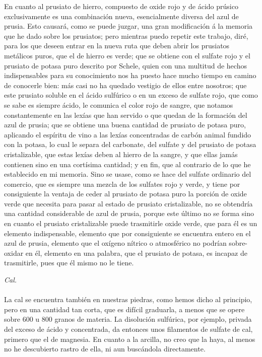 \documentclass[a4paper, 11pt, oneside, polutonikogreek, spanish]{article}
\begin{document}
En cuanto al prusiato de hierro, compuesto de oxide rojo y de ácido prúsico exclusivamente es una combinación nueva, esencialmente diversa del azul de prusia. Esto causará, como se puede juzgar, una gran modificación á la memoria que he dado sobre los prusiatos; pero mientras puedo repetir este trabajo, diré, para los que deseen entrar en la nueva ruta que deben abrir los prusiatos metálicos puros, que el de hierro es verde; que se obtiene con el sulfate rojo y el prusiato de potasa puro descrito por Schele, quien con una multitud de hechos indispensables para su conocimiento nos ha puesto hace mucho tiempo en camino de conocerle bien: más casi no ha quedado vestigio de ellos entre nosotros; que este prusiato soluble en el ácido sulfúrico o en un exceso de sulfate rojo, que como se sabe es siempre ácido, le comunica el color rojo de sangre, que notamos constantemente en las lexías que han servido o que quedan de la formación del azul de prusia; que se obtiene una buena cantidad de prusiato de potasa puro, aplicando el espíritu de vino a las lexías concentradas de carbón animal fundido con la potasa, lo cual le separa del carbonate, del sulfate y del prusiato de potasa cristalizable, que estas lexías deben al hierro de la sangre, y que ellas jamás contienen sino en una cortísima cantidad; y en fin, que al contrario de lo que he establecido en mi memoria. Sino se usase, como se hace del sulfate ordinario del comercio, que es siempre una mezcla de los sulfates rojo y verde, y tiene por consiguiente la ventaja de ceder al prusiato de potasa puro la porción de oxide verde que necesita para pasar al estado de prusiato cristalizable, no se obtendría una cantidad considerable de azul de prusia, porque este último no se forma sino en cuanto el prusiato cristalizable puede trasmitirle oxide verde, que para él es un elemento indispensable, elemento que por consiguiente se encuentra entero en el azul de prusia, elemento que el oxígeno nítrico o atmosférico no podrían sobre-oxidar en él, elemento en una palabra, que el prusiato de potasa, es incapaz de trasmitirle, pues que él mismo no le tiene.
\clearpage
\begin{center}
\emph{Cal.}
\end{center}
\paragraph{}
La cal se encuentra también en nuestras piedras, como hemos dicho al principio, pero en una cantidad tan corta, que es difícil graduarla, a menos que se opere sobre 600 u 800 granos de materia. La disolución sulfúrica, por ejemplo, privada del exceso de ácido y concentrada, da entonces unos filamentos de sulfate de cal, primero que el de magnesia. En cuanto a la arcilla, no creo que la haya, al menos no he descubierto rastro de ella, ni aun buscándola directamente.
\end{document}
